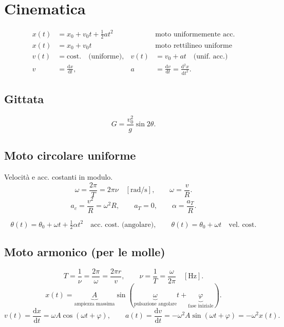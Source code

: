 \documentclass[a4paper,11pt]{article}
\newcommand{\dd}{\mathrm{d}}
\begin{document}
\section*{Cinematica}
\begin{align*}
x(t)&=x_0+v_0t+\tfrac12at^2 &&\text{moto uniformemente acc.}\\
x(t)&=x_0+v_0t &&\text{moto rettilineo uniforme}\\
v(t)&=\text{cost.}\quad\text{(uniforme)},&v(t)&=v_0+at\quad\text{(unif. acc.)}\\
v&=\frac{\dd x}{\dd t},&a&=\frac{\dd v}{\dd t}=\frac{\dd^2x}{\dd t^2}.
\end{align*}
\subsection*{Gittata}
\[G=\frac{v_0^2}{g}\sin 2\theta.\]
\begin{center}\end{center}
\subsection*{Moto circolare uniforme}
Velocità e acc. costanti in modulo.
\[\omega=\frac{2\pi}{T}=2\pi\nu\quad[\mathrm{rad/s}],\qquad \omega=\frac vR.\]
\[a_c=\frac{v^2}{R}=\omega^2R,\qquad a_T=0,\qquad \alpha=\frac{a_T}{R}.\]
\begin{center}\end{center}
\[\theta(t)=\theta_0+\omega t+\tfrac12\alpha t^2\quad\text{acc. cost. (angolare)},\qquad
\theta(t)=\theta_0+\omega t\quad\text{vel. cost.}\]
\subsection*{Moto armonico (per le molle)}
\[T=\frac1\nu=\frac{2\pi}{\omega}=\frac{2\pi r}{v},\qquad \nu=\frac1T=\frac{\omega}{2\pi}\quad[\mathrm{Hz}].\]
\[x(t)=\underbrace{A}_{\text{ampiezza massima}}\sin(\underbrace{\omega}_{\text{pulsazione angolare}}t+\underbrace{\varphi}_{\text{fase iniziale}}).\]
\[v(t)=\frac{\dd x}{\dd t}=\omega A\cos(\omega t+\varphi),\qquad
 a(t)=\frac{\dd v}{\dd t}=-\omega^2A\sin(\omega t+\varphi)=-\omega^2x(t).\]
\begin{center}\end{center}
\end{document}

